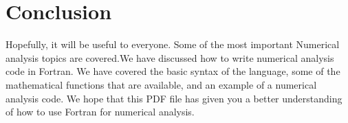 \documentclass{article}
\begin{document}
\section*{Conclusion}
Hopefully, it will be useful to everyone. Some of the most important Numerical analysis topics are covered.We have discussed how to write numerical analysis code in Fortran. We have covered the basic syntax of the language, some of the mathematical functions that are available, and an example of a numerical analysis code. We hope that this PDF file has given you a better understanding of how to use Fortran for numerical analysis.






    
    
   
\end{document}
